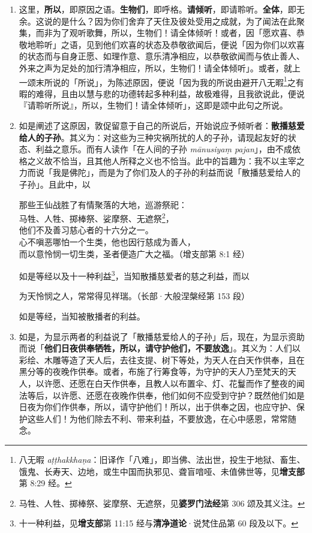 \begin{enumerate}\item 这里，\textbf{所以}，即原因之语。\textbf{生物们}，即呼格。\textbf{请倾听}，即请聆听。\textbf{全体}，即无余。这说的是什么？因为你们舍弃了天住及彼处受用之成就，为了闻法在此聚集，而非为了观听歌舞，所以，生物们！请全体倾听！或者，因「愿欢喜、恭敬地聆听」之语，见到他们欢喜的状态及恭敬欲闻后，便说「因为你们以欢喜的状态而与自身正愿、如理作意、意乐清净相应，以恭敬欲闻而与依止善人、外来之声为足处的加行清净相应，所以，生物们！请全体倾听」。或者，就上一颂末所说的「所说」，为陈述原因，便说「因为我的所说由避开八无暇\footnote{八无暇 \textit{aṭṭhakkhaṇa}：旧译作「八难」，即当佛、法出世，投生于地狱、畜生、饿鬼、长寿天、边地，或生中国而执邪见、聋盲喑哑、未值佛世等，见\textbf{增支部}第 8:29 经。}之有暇的难得，且由以慧与悲的功德转起多种利益，故极难得，且我欲说此，便说『请聆听所说』，所以，生物们！请全体倾听」，这即是颂中此句之所说。
\item 如是阐述了这原因，敦促留意于自己的所说后，开始说应予倾听者：\textbf{散播慈爱给人的子孙}。其义为：对这些为三种灾祸所扰的人的子孙，请现起友好的状态、利益之意乐。而有人读作「在人间的子孙 \textit{mānusiyaṃ pajan}」，由不成依格之义故不恰当，且其他人所释之义也不恰当。此中的旨趣为：我不以主宰之力而说「我是佛陀」，而是为了你们及人的子孙的利益而说「散播慈爱给人的子孙」。且此中，以\begin{quoting}那些王仙战胜了有情聚落的大地，巡游祭祀：\\马牲、人牲、掷棒祭、娑摩祭、无遮祭\footnote{马牲、人牲、掷棒祭、娑摩祭、无遮祭，见\textbf{婆罗门法经}第 306 颂及其义注。}，\\他们不及善习慈心者的十六分之一。\\心不嗔恶哪怕一个生类，他也因行慈成为善人，\\而以意怜悯一切生类，圣者便造广大之福。（增支部第 8:1 经）\end{quoting}如是等经以及十一种利益\footnote{十一种利益，见\textbf{增支部}第 11:15 经与\textbf{清净道论}·说梵住品第 60 段及以下。}，当知散播慈爱者的慈之利益，而以\begin{quoting}为天怜悯之人，常常得见祥瑞。（长部·大般涅槃经第 153 段）\end{quoting}如是等经，当知被散播者的利益。
\item 如是，为显示两者的利益说了「散播慈爱给人的子孙」后，现在，为显示资助而说「\textbf{他们日夜供奉牺牲，所以，请守护他们，不要放逸}」。其义为：人们以彩绘、木雕等造了天人后，去往支提、树下等处，为天人在白天作供奉，且在黑分等的夜晚作供奉。或者，布施了行筹食等，为守护的天人乃至梵天的天人，以许愿、还愿在白天作供奉，且教人以布置伞、灯、花鬘而作了整夜的闻法等后，以许愿、还愿在夜晚作供奉，他们如何不应受到守护？既然他们如是日夜为你们作供奉，所以，请守护他们！所以，出于供奉之因，也应守护、保护这些人们！为他们除去不利、带来利益，不要放逸，在心中感恩，常常随念。\end{enumerate}

